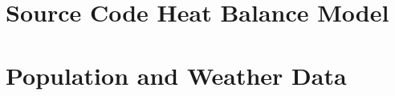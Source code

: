 
\appendix
\section{Source Code Heat Balance Model}\label{sec:python_code}

    

\section{Population and Weather Data}\label{sec:pop_weather}

    